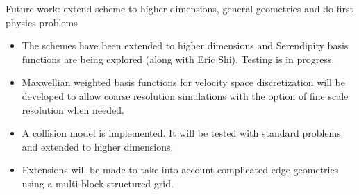 \documentclass[pdf]{beamer}
\theoremstyle{definition}
\begin{document}
\begin{frame}{Future work: extend scheme to higher dimensions, general
    geometries and do first physics problems}%

  \begin{itemize}
    \small
  \item The schemes have been extended to higher dimensions and
    Serendipity basis functions are being explored (along with Eric
    Shi). Testing is in progress.
  \item Maxwellian weighted basis functions for velocity space
    discretization will be developed to allow coarse resolution
    simulations with the option of fine scale resolution when needed.
  \item A collision model is implemented. It will be tested with
    standard problems and extended to higher dimensions.
  \item Extensions will be made to take into account complicated edge
    geometries using a multi-block structured grid.
  \end{itemize}
\end{frame}
\end{document}
